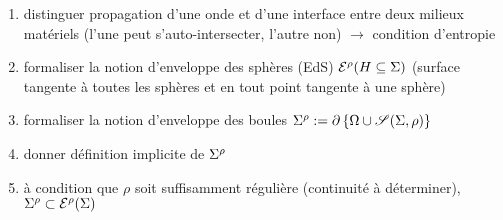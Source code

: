 \par\bigskip
\begin{enumerate}
	\item distinguer propagation d'une onde et d'une interface entre deux milieux matériels (l'une peut s'auto-intersecter, l'autre non) $\to$ condition d'entropie
	\item formaliser la notion d'enveloppe des sphères (EdS) ${\mathcal{E}}^{\rho}({H \subseteq \Sigma})$ (surface tangente à toutes les sphères et en tout point tangente à une sphère)
	\item formaliser la notion d'enveloppe des boules $\EoB{\Sigma}{\rho} := \boundary{\left\{\Omega \cup \sphere[\Sigma][\rho]\right\}}$
	\item donner définition implicite de ${\Sigma}^{\rho}$
	\item à condition que $\rho$ soit suffisamment régulière (continuité à déterminer), ${\Sigma}^{\rho} \subset {\mathcal{E}}^{\rho}({\Sigma})$
\end{enumerate}


